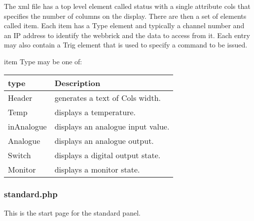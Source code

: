 The xml file has a top level element called status with a single attribute cols that specifies the number of columns on the
display. There are then a set of elements called item. Each item has a Type element and typically a channel number and an
IP address to identify the webbrick and the data to access from it. Each entry may also contain a Trig element that is used to
specify a command to be issued.

item Type may be one of:

\begin{tabular}{l|p{12cm}}
    type&Description\\
    \hline
    Header&generates a text of Cols width.\\
    Temp&displays a temperature.\\
    inAnalogue&displays an analogue input value.\\
    Analogue&displays an analogue output.\\
    Switch&displays a digital output state.\\
    Monitor&displays a monitor state.\\
\end{tabular}

\subsubsection{standard.php}

This is the start page for the standard panel.

